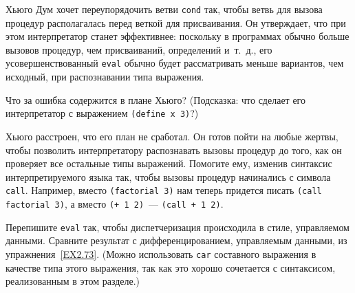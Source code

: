 \begin{exercise}{4.2}%
\label{EX4.2}%
Хьюго Дум хочет переупорядочить ветви
{\tt cond} так, чтобы ветвь для вызова процедур располагалась
перед веткой для присваивания. Он утверждает, что при этом интерпретатор
станет эффективнее: поскольку в программах обычно больше вызовов
процедур, чем присваиваний, определений и~т.~д., его усовершенствованный
{\tt eval} обычно будет рассматривать меньше вариантов, чем
исходный, при распознавании типа выражения.
 
\begin{plainenum}
\item
Что за ошибка содержится в плане Хьюго? (Подсказка:
что сделает его интерпретатор с выражением {\tt (define x 3)}?)

\item
{}Хьюго расстроен, что его план не 
сработал.  Он готов пойти на любые жертвы, чтобы позволить интерпретатору
распознавать вызовы процедур до того, как он проверяет все остальные
типы выражений.  Помогите ему, изменив синтаксис интерпретируемого
языка так, чтобы вызовы процедур начинались с символа
{\tt call}.  Например, вместо {\tt (factorial 3)} нам
теперь придется писать {\tt (call factorial 3)}, а вместо
{\tt (+ 1 2)}~--- {\tt (call + 1 2)}.
\end{plainenum}
\end{exercise}

\begin{exercise}{4.3}%
\label{EX4.3}%
Перепишите {\tt eval}
так, чтобы 
диспетчеризация происходила в стиле, управляемом данными.
Сравните результат с 
дифференцированием, управляемым данными, из 
упражнения~\ref{EX2.73}. (Можно использовать {\tt car}
составного выражения в качестве типа этого выражения, так как это
хорошо сочетается с синтаксисом, реализованным в этом разделе.)
\end{exercise}

